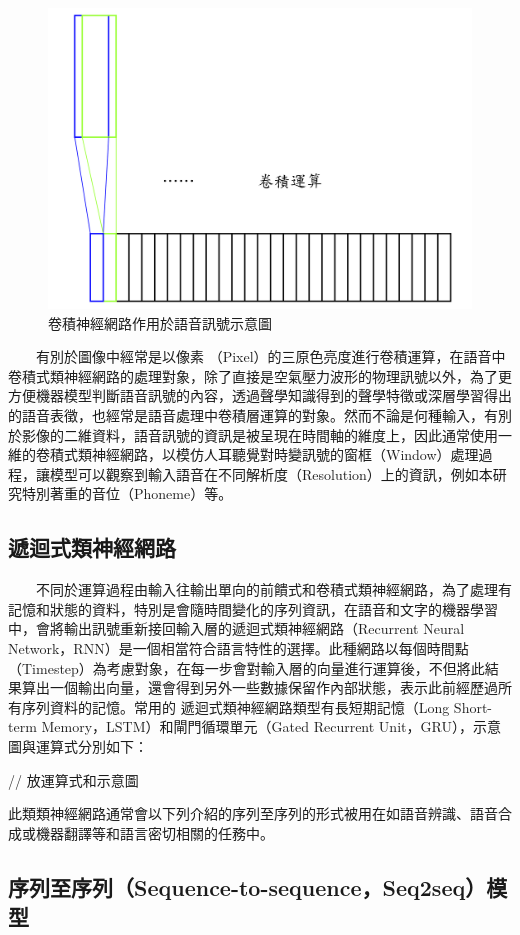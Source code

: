 \begin{figure}
    \centering
    \includegraphics[width=0.5\linewidth]{figures/speechCNN.png}
    \caption{卷積神經網路作用於語音訊號示意圖}
    \label{fig:speech-cnn}
\end{figure}

　　有別於圖像中經常是以像素 （Pixel）的三原色亮度進行卷積運算，在語音中卷積式類神經網路的處理對象，除了直接是空氣壓力波形的物理訊號以外，為了更方便機器模型判斷語音訊號的內容，透過聲學知識得到的聲學特徵或深層學習得出的語音表徵，也經常是語音處理中卷積層運算的對象。然而不論是何種輸入，有別於影像的二維資料，語音訊號的資訊是被呈現在時間軸的維度上，因此通常使用一維的卷積式類神經網路，以模仿人耳聽覺對時變訊號的窗框（Window）處理過程，讓模型可以觀察到輸入語音在不同解析度（Resolution）上的資訊，例如本研究特別著重的音位（Phoneme）等。

\subsection{遞迴式類神經網路}

　　不同於運算過程由輸入往輸出單向的前饋式和卷積式類神經網路，為了處理有記憶和狀態的資料，特別是會隨時間變化的序列資訊，在語音和文字的機器學習中，會將輸出訊號重新接回輸入層的遞迴式類神經網路（Recurrent Neural Network，RNN）是一個相當符合語言特性的選擇。此種網路以每個時間點（Timestep）為考慮對象，在每一步會對輸入層的向量進行運算後，不但將此結果算出一個輸出向量，還會得到另外一些數據保留作內部狀態，表示此前經歷過所有序列資料的記憶。常用的 遞迴式類神經網路類型有長短期記憶（Long Short-term Memory，LSTM）和閘門循環單元（Gated Recurrent Unit，GRU），示意圖與運算式分別如下：



// 放運算式和示意圖

此類類神經網路通常會以下列介紹的序列至序列的形式被用在如語音辨識、語音合成或機器翻譯等和語言密切相關的任務中。

\subsection{序列至序列（Sequence-to-sequence，Seq2seq）模型}

